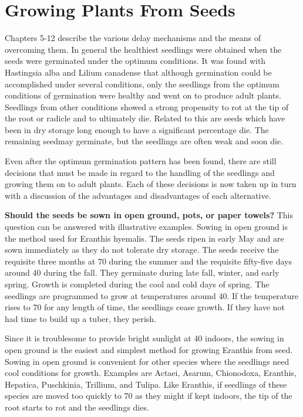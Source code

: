\chapter{Growing Plants From Seeds}

Chapters 5-12 describe the various delay mechanisms and the means of
overcoming them. In general the healthiest seedlings were obtained when the seeds
were germinated under the optimum conditions. It was found with Hastingsia alba and
Lilium canadense that although germination could be accomplished under several
conditions, only the seedlings from the optimum conditions of germination were
healthy and went on to produce adult plants. Seedlings from other conditions showed
a strong propensity to rot at the tip of the root or radicle and to ultimately die. Related
to this are seeds which have been in dry storage long enough to have a significant
percentage die. The remaining seedmay germinate, but the seedlings are often
weak and soon die.

Even after the optimum germination pattern has been found, there are still
decisions that must be made in regard to the handling of the seedlings and growing
them on to adult plants. Each of these decisions is now taken up in turn with a
discussion of the advantages and disadvantages of each alternative.

\textbf{Should the seeds be sown in open ground, pots, or paper towels?}
This question can be answered with illustrative examples. Sowing in open ground is
the method used for Eranthis hyemalis. The seeds ripen in early May and are sown
immediately as they do not tolerate dry storage. The seeds receive the requisite three
months at 70 during the summer and the requisite fifty-five days around 40 during the
fall. They germinate during late fall, winter, and early spring. Growth is completed
during the cool and cold days of spring. The seedlings are programmed to grow at
temperatures around 40. If the temperature rises to 70 for any length of time, the
seedlings cease growth. If they have not had time to build up a tuber, they perish.

Since it is troublesome to provide bright sunlight at 40 indoors, the sowing in open
ground is the easiest and simplest method for growing Eranthis from seed.
Sowing in open ground is convenient for other species where the seedlings
need cool conditions for growth. Examples are Actaei, Asarum, Chionodoxa, Eranthis,
Hepatica, Puschkinia, Trillium, and Tulipa. Like Eranthis, if seedlings of these species
are moved too quickly to 70 as they might if kept indoors, the tip of the root starts to rot
and the seedlings dies.

